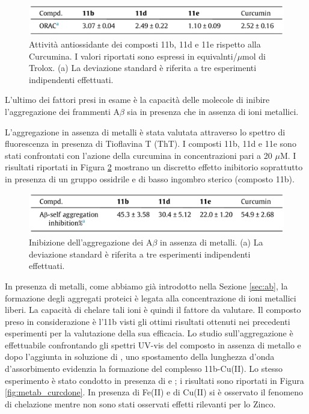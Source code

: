 \documentclass[a4paper, 12pt]{article}
\begin{document}
\begin{figure}[H]
	\centering
	\includegraphics[width=\linewidth]{immagini/roi_curcdone.png}
	\caption{Attività antiossidante dei composti 11b, 11d e 11e rispetto alla Curcumina. I valori riportati sono espressi in equivalnti/$\mu$mol di Trolox. (a) La deviazione standard è riferita a tre esperimenti indipendenti effettuati.}
	\label{fig:roi_curcdone}
\end{figure}


L'ultimo dei fattori presi in esame è la capacità delle molecole di inibire l'aggregazione dei frammenti A$\beta$ sia in presenza che in assenza di ioni metallici.

L'aggregazione in assenza di metalli è stata valutata attraverso lo spettro di fluorescenza in presenza di Tioflavina T (ThT). I composti 11b, 11d e 11e sono stati confrontati con l'azione della curcumina in concentrazioni pari a 20 $\mu$M. I risultati riportati in Figura \ref{fig:selfab_curcdone} mostrano un discretto effetto inibitorio soprattutto in presenza di un gruppo ossidrile e di basso ingombro sterico (composto 11b).

\begin{figure}[H]
	\centering
	\includegraphics[width=\linewidth]{immagini/selfab_curcdone.png}
	\caption{Inibizione dell'aggregazione dei A$\beta$ in assenza di metalli. (a) La deviazione standard è riferita a tre esperimenti indipendenti effettuati.}
	\label{fig:selfab_curcdone}
\end{figure}

In presenza di metalli, come abbiamo già introdotto nella Sezione \ref{sec:ab}, la formazione degli aggregati proteici è legata alla concentrazione di ioni metallici liberi. La capacità di chelare tali ioni è quindi il fattore da valutare. Il composto preso in considerazione è l'11b visti gli ottimi risultati ottenuti nei precedenti esperimenti per la valutazione della sua efficacia. Lo studio sull'aggregazione è effettuabile confrontando gli spettri UV-vis del composto in assenza di metallo e dopo l'aggiunta in soluzione di , uno spostamento della lunghezza d'onda d'assorbimento evidenzia la formazione del complesso 11b-Cu(II). Lo stesso esperimento è stato condotto in presenza di  e ; i risultati sono riportati in Figura \ref{fig:metab_curcdone}. In presenza di Fe(II) e di Cu(II) si è osservato il fenomeno di chelazione mentre non sono stati osservati effetti rilevanti per lo Zinco. \cite{noauthor_design_2017}
\end{document}
